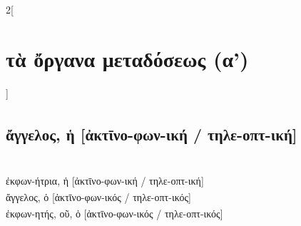\documentclass{book}
\begin{document}
\begin{multicols}{2}[\section{τὰ ὄργανα μεταδόσεως (α')}]
\subsection{ἄγγελος, ἡ [ἀκτῑνο-φων-ική\textsuperscript{\textdaggerdbl\number\value{footnote}} / τηλε-οπτ-ική\textsuperscript{\textdagger}]} 
 ~\\
{ἐκφων-ήτρια\textsuperscript{\textdagger}, ἡ [ἀκτῑνο-φων-ική\textsuperscript{\textdaggerdbl\number\value{footnote}} / τηλε-οπτ-ική\textsuperscript{\textdagger}]}
 ~\\
{ἄγγελος, ὁ [ἀκτῑνο-φων-ικός\textsuperscript{\textdaggerdbl\number\value{footnote}} / τηλε-οπτ-ικός\textsuperscript{\textdagger}]}
 ~\\
{ἐκφων-ητής\textsuperscript{\textdagger}, οῦ, ὁ [ἀκτῑνο-φων-ικός\textsuperscript{\textdaggerdbl\number\value{footnote}} / τηλε-οπτ-ικός\textsuperscript{\textdagger}]}
~
\end{multicols}
\newpage  
\end{document}
